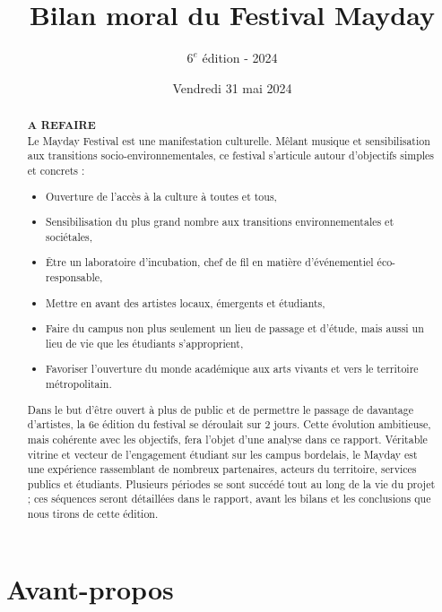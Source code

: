 \documentclass[12pt,a4paper]{report}
\title{Bilan moral du Festival Mayday}
\author{$6^e$ édition - 2024}
\date{Vendredi 31 mai 2024}
\begin{document}
\maketitle

\begin{abstract}
\textbf{A REFAIRE} \\
Le Mayday Festival est une manifestation culturelle. Mêlant musique et sensibilisation aux transitions socio-environnementales, ce festival s'articule autour d'objectifs simples et concrets :
\begin{itemize}
\item Ouverture de l’accès à la culture à toutes et tous,
\item Sensibilisation du plus grand nombre aux transitions environnementales et sociétales,
\item Être un laboratoire d’incubation, chef de fil en matière d’événementiel éco-responsable,
\item Mettre en avant des artistes locaux, émergents et étudiants,
\item Faire du campus non plus seulement un lieu de passage et d'étude, mais aussi un lieu de vie que les étudiants s'approprient,
\item \sloppy Favoriser l’ouverture du monde académique aux arts vivants et vers le territoire métropolitain.
\end{itemize}
Dans le but d’être ouvert à plus de public et de permettre le passage de davantage d’artistes, la 6e édition du festival se déroulait sur 2 jours. Cette évolution ambitieuse, mais cohérente avec les objectifs, fera l’objet d’une analyse dans ce rapport. Véritable vitrine et vecteur de l'engagement étudiant sur les campus bordelais, le Mayday est une expérience rassemblant de nombreux partenaires, acteurs du territoire, services publics et étudiants. Plusieurs périodes se sont succédé tout au long de la vie du projet ; ces séquences seront détaillées dans le rapport, avant les bilans et les conclusions que nous tirons de cette édition.
\end{abstract}

\tableofcontents

\newpage

\section*{Avant-propos}
\end{document}

